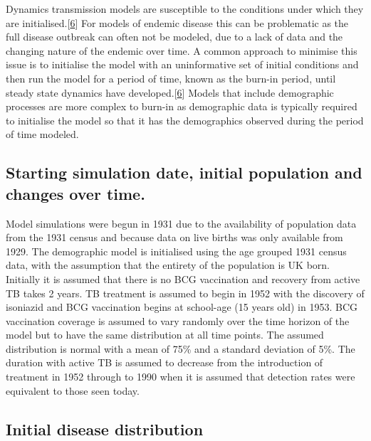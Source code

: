 \documentclass[11pt,twoside]{bristolthesis}
\begin{document}
  Dynamics transmission models are susceptible to the conditions under which they are initialised.{[}\protect\hyperlink{ref-Anderson1991}{6}{]} For models of endemic disease this can be problematic as the full disease outbreak can often not be modeled, due to a lack of data and the changing nature of the endemic over time. A common approach to minimise this issue is to initialise the model with an uninformative set of initial conditions and then run the model for a period of time, known as the burn-in period, until steady state dynamics have developed.{[}\protect\hyperlink{ref-Anderson1991}{6}{]} Models that include demographic processes are more complex to burn-in as demographic data is typically required to initialise the model so that it has the demographics observed during the period of time modeled.
  
  \hypertarget{starting-simulation-date-initial-population-and-changes-over-time.}{%
  \subsection{Starting simulation date, initial population and changes over time.}\label{starting-simulation-date-initial-population-and-changes-over-time.}}
  
  Model simulations were begun in 1931 due to the availability of population data from the 1931 census and because data on live births was only available from 1929. The demographic model is initialised using the age grouped 1931 census data, with the assumption that the entirety of the population is UK born. Initially it is assumed that there is no BCG vaccination and recovery from active TB takes 2 years. TB treatment is assumed to begin in 1952 with the discovery of isoniazid and BCG vaccination begins at school-age (15 years old) in 1953. BCG vaccination coverage is assumed to vary randomly over the time horizon of the model but to have the same distribution at all time points. The assumed distribution is normal with a mean of 75\% and a standard deviation of 5\%. The duration with active TB is assumed to decrease from the introduction of treatment in 1952 through to 1990 when it is assumed that detection rates were equivalent to those seen today.
  
  \hypertarget{initial-disease-distribution}{%
  \subsection{Initial disease distribution}\label{initial-disease-distribution}}
  
\end{document}
